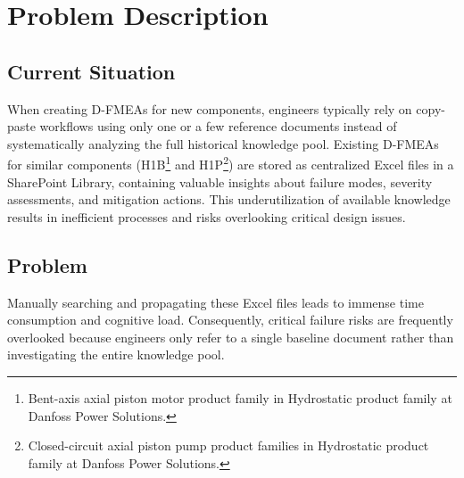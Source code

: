 
\section{Problem Description}

\subsection*{Current Situation}

When creating D-FMEAs for new components, engineers typically rely on copy-paste workflows using only one or a few reference documents instead of systematically analyzing the full historical knowledge pool. Existing D-FMEAs for similar components (H1B\footnote{Bent-axis axial piston motor product family in Hydrostatic product family at Danfoss Power Solutions.} and H1P\footnote{Closed-circuit axial piston pump product families in Hydrostatic product family at Danfoss Power Solutions.}) are stored as centralized Excel files in a SharePoint Library, containing valuable insights about failure modes, severity assessments, and mitigation actions. This underutilization of available knowledge results in inefficient processes and risks overlooking critical design issues.

\subsection*{Problem}

Manually searching and propagating these Excel files leads to immense time consumption and cognitive load. Consequently, critical failure risks are frequently overlooked because engineers only refer to a single baseline document rather than investigating the entire knowledge pool.


